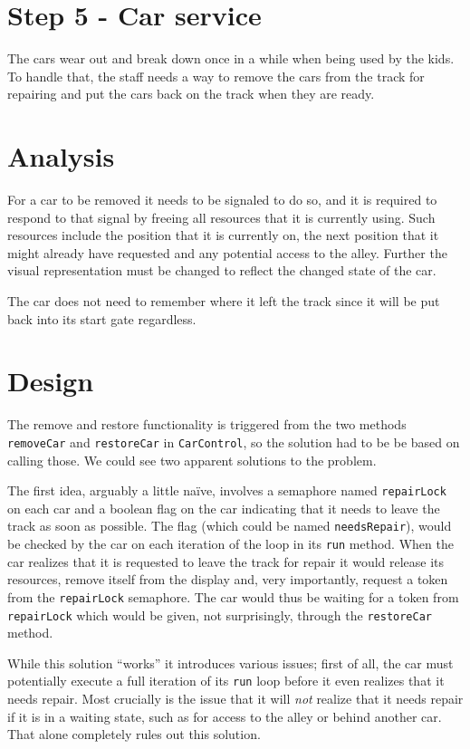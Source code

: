 \section*{Step 5 - Car service}

The cars wear out and break down once in a while when being used by the kids. To handle that, the staff needs a way to remove the cars from the track for repairing and put the cars back on the track when they are ready.

\section{Analysis}

For a car to be removed it needs to be signaled to do so, and it is required to respond to that signal by freeing all resources that it is currently using. Such resources include the position that it is currently on, the next position that it might already have requested and any potential access to the alley. Further the visual representation must be changed to reflect the changed state of the car.

The car does not need to remember where it left the track since it will be put back into its start gate regardless.

\section{Design}

The remove and restore functionality is triggered from the two methods \texttt{removeCar} and \texttt{restoreCar} in \texttt{CarControl}, so the solution had to be be based on calling those. We could see two apparent solutions to the problem.

The first idea, arguably a little na\"ive, involves a semaphore named \texttt{repairLock} on each car and a boolean flag on the car indicating that it needs to leave the track as soon as possible. The flag (which could be named \texttt{needsRepair}), would be checked by the car on each iteration of the loop in its \texttt{run} method. When the car realizes that it is requested to leave the track for repair it would release its resources, remove itself from the display and, very importantly, request a token from the \texttt{repairLock} semaphore. The car would thus be waiting for a token from \texttt{repairLock} which would be given, not surprisingly, through the \texttt{restoreCar} method.

While this solution ``works'' it introduces various issues; first of all, the car must potentially execute a full iteration of its \texttt{run} loop before it even realizes that it needs repair. Most crucially is the issue that it will \emph{not} realize that it needs repair if it is in a waiting state, such as for access to the alley or behind another car. That alone completely rules out this solution.

